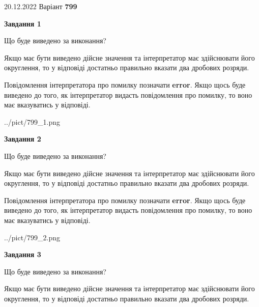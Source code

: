 \documentclass[12pt, ukrainian]{article}
\begin{document}
{20.12.2022 Варіант \No \textbf { 799 }\par}
{
\begin {Large}

{\begin {center}\textbf{Завдання 1}\end {center}}\par
Що буде виведено за виконання? \par

Якщо має бути виведено дійсне значення та інтерпретатор має здійснювати його округлення, 
то у відповіді достатньо правильно вказати два дробових розряди.

Повідомлення інтерпретатора про помилку позначати \textbf{error}.
Якщо щось буде виведено до того, як інтерпретатор видасть повідомлення про помилку, 
то воно має вказуватись у відповіді. \par

\begin{center}
	{../pict/799_1.png}
\end{center}
\newpage

{\begin {center}\textbf{Завдання 2}\end {center}}\par
Що буде виведено за виконання? \par

Якщо має бути виведено дійсне значення та інтерпретатор має здійснювати його округлення, 
то у відповіді достатньо правильно вказати два дробових розряди.

Повідомлення інтерпретатора про помилку позначати \textbf{error}.
Якщо щось буде виведено до того, як інтерпретатор видасть повідомлення про помилку, 
то воно має вказуватись у відповіді. \par

\begin{center}
	{../pict/799_2.png}
\end{center}
\newpage

{\begin {center}\textbf{Завдання 3}\end {center}}\par
Що буде виведено за виконання? \par

Якщо має бути виведено дійсне значення та інтерпретатор має здійснювати його округлення, 
то у відповіді достатньо правильно вказати два дробових розряди.


\end{Large}}
\end{document}
